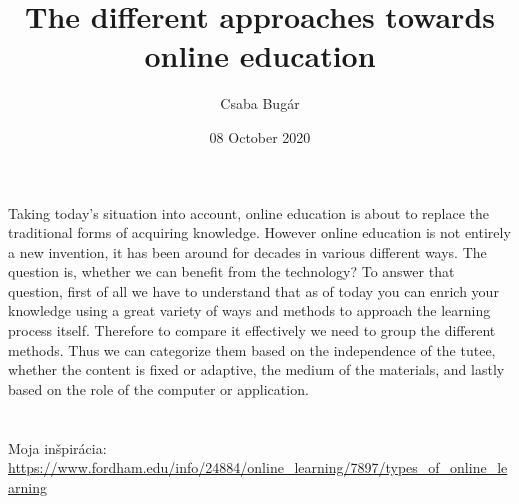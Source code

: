 \documentclass[12pt,english]{article}
\title{The different approaches towards online education }
\author{Csaba Bugár}
\date{08 October 2020}
\begin{document}
\maketitle

Taking today's situation into account, online education is about to replace the traditional forms of acquiring knowledge. However online education is not entirely a new invention, it has been around for decades in various different ways. The question is, whether we can benefit from the technology? To answer that question, first of all we have to understand that as of today you can enrich your knowledge using a great variety of ways and methods to approach the learning process itself. Therefore to compare it effectively we need to group the different methods. Thus  we can categorize them based on the independence of the tutee, whether the content is fixed or adaptive, the medium of the materials, and lastly based on the role of the computer or application.


\section*{}
Moja inšpirácia: \url{https://www.fordham.edu/info/24884/online_learning/7897/types_of_online_learning}
\end{document}
